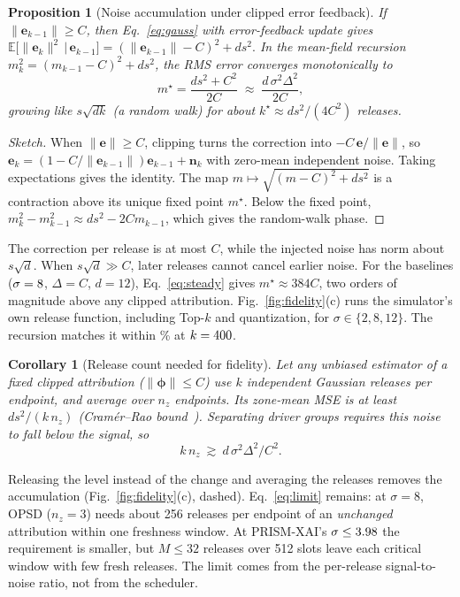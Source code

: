 \documentclass[conference]{IEEEtran}
\newcommand{\method}{PRISM-XAI}
\newtheorem{proposition}{Proposition}
\newtheorem{corollary}{Corollary}
\begin{document}
\begin{proposition}[Noise accumulation under clipped error feedback]\label{prop:ef}
If $\|\bm e_{k-1}\|\ge C$, then Eq.~\eqref{eq:gauss} with error-feedback update gives
$\mathbb E\big[\|\bm e_k\|^2\,\big|\,\bm e_{k-1}\big]=(\|\bm e_{k-1}\|-C)^2+d s^2.$
In the mean-field recursion $m_k^2=(m_{k-1}-C)^2+ds^2$, the RMS error converges
monotonically to
\begin{equation}
m^\star=\frac{d s^2+C^2}{2C}\;\approx\;\frac{d\,\sigma^2\Delta^2}{2C},\label{eq:steady}
\end{equation}
growing like $s\sqrt{dk}$ (a random walk) for about $k^\star\approx d s^2/(4C^2)$
releases.
\end{proposition}
\begin{proof}[Sketch]
When $\|\bm e\|\ge C$, clipping turns the correction into $-C\,\bm e/\|\bm e\|$,
so $\bm e_k=(1-C/\|\bm e_{k-1}\|)\bm e_{k-1}+\bm n_k$ with zero-mean independent
noise. Taking expectations gives the identity. The map
$m\mapsto\sqrt{(m-C)^2+ds^2}$ is a contraction above its unique fixed point
$m^\star$. Below the fixed point, $m_k^2-m_{k-1}^2\approx ds^2-2Cm_{k-1}$, which
gives the random-walk phase.
\end{proof}

The correction per release is at most $C$, while the injected noise has norm
about $s\sqrt d$. When $s\sqrt d\gg C$, later releases cannot cancel earlier noise.
For the baselines ($\sigma=8$, $\Delta=C$, $d=12$), Eq.~\eqref{eq:steady}
gives $m^\star\approx384C$, two orders of magnitude above any clipped
attribution. Fig.~\ref{fig:fidelity}(c) runs the simulator's own release function,
including Top-$k$ and quantization, for $\sigma\in\{2,8,12\}$. The recursion
matches it within \propMaxRelErr\% at $k=400$.

\begin{corollary}[Release count needed for fidelity]\label{cor:limit}
Let any unbiased estimator of a fixed clipped attribution ($\|\bm\phi\|\le C$) use
$k$ independent Gaussian releases per endpoint, and average over $n_z$
endpoints. Its zone-mean MSE is at least $ds^2/(k\,n_z)$ (Cram\'er--Rao
bound~\cite{kay1993}). Separating driver groups requires this noise to fall below
the signal, so
\begin{equation}
k\,n_z\ \gtrsim\ d\,\sigma^2\Delta^2/C^2 .\label{eq:limit}
\end{equation}
\end{corollary}
Releasing the level instead of the change and averaging the releases removes
the accumulation (Fig.~\ref{fig:fidelity}(c), dashed). Eq.~\eqref{eq:limit}
remains: at $\sigma=8$, OPSD ($n_z=3$) needs about 256 releases per endpoint of an
\emph{unchanged} attribution within one freshness window. At \method{}'s
$\sigma\le3.98$ the requirement is smaller, but $M\le32$ releases over 512
slots leave each critical window with few fresh releases. The limit comes from
the per-release signal-to-noise ratio, not from the scheduler.
\end{document}
